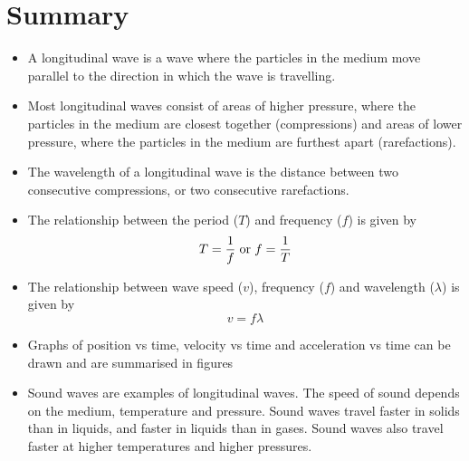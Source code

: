     \noindent
  \label{m38782**end}
                   \label{m38783*cid8}
            \section{Summary}
            \nopagebreak
      \label{m38783*id293550}\begin{itemize}[noitemsep] 
            \label{m38783*uid20}\item A longitudinal wave is a wave where the particles in the medium move parallel to the direction in which the wave is travelling.
\label{m38783*uid21}\item Most longitudinal waves consist of areas of higher pressure, where the particles in the medium are closest together (compressions) and areas of lower pressure, where the particles in the medium are furthest apart (rarefactions).
\label{m38783*uid22}\item The wavelength of a longitudinal wave is the distance between two consecutive compressions, or two consecutive rarefactions.
\label{m38783*uid23}\item The relationship between the period ($T$) and frequency ($f$) is given by
\label{m38783*id293619}\nopagebreak\noindent{}
    \begin{equation}\nonumber
    T=\frac{1}{f}\phantom{\rule{3pt}{0ex}}\text{or}\phantom{\rule{3pt}{0ex}}f=\frac{1}{T}
      \end{equation}
    \label{m38783*uid24}\item The relationship between wave speed ($v$), frequency ($f$) and wavelength ($\lambda $) is given by
\label{m38783*id293694}\nopagebreak\noindent{}
    \begin{equation}\nonumber
    v=f\lambda
      \end{equation}
    \label{m38783*uid25}\item Graphs of position vs time, velocity vs time and acceleration vs time can be drawn and are summarised in figures
\label{m38783*uid26}\item Sound waves are examples of longitudinal waves. The speed of sound depends on the medium, temperature and pressure. Sound waves travel faster in solids than in liquids, and faster in liquids than in gases. Sound waves also travel faster at higher temperatures and higher pressures.
\end{itemize}
